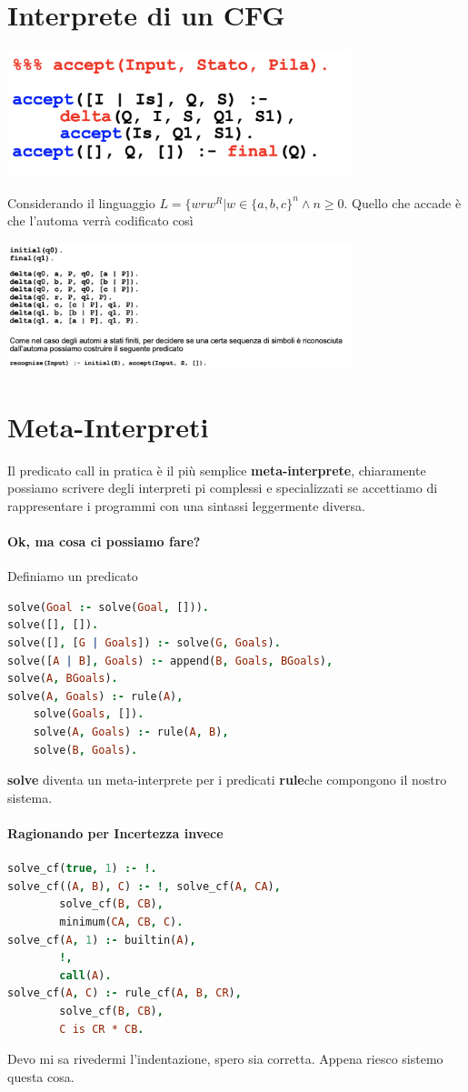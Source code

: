 \documentclass[12pt, a4paper, openany, oneside]{book}
\begin{document}
\section{Interprete di un CFG}
\begin{center}
\includegraphics[width=0.75\textwidth]{acceptpila}
\end{center}
Considerando il linguaggio $L=\{wrw^{R}|w \in\{a,b,c\}^{n} \wedge n\geq0$.
Quello che accade è che l'automa verrà codificato così
\begin{center}
\includegraphics[width=0.75\textwidth]{codificaauto}
\end{center}
\section{Meta-Interpreti}
Il predicato call in pratica è il più semplice \textbf{meta-interprete},
chiaramente possiamo scrivere degli interpreti pi complessi e specializzati
se accettiamo di rappresentare i programmi con una sintassi leggermente 
diversa.
\paragraph{Ok, ma cosa ci possiamo fare? }Definiamo un predicato 
\begin{lstlisting}[language=Prolog]
solve(Goal :- solve(Goal, [])).
solve([], []).
solve([], [G | Goals]) :- solve(G, Goals). 
solve([A | B], Goals) :- append(B, Goals, BGoals),
solve(A, BGoals). 
solve(A, Goals) :- rule(A),
	solve(Goals, []). 
	solve(A, Goals) :- rule(A, B), 
	solve(B, Goals).
\end{lstlisting}
\textbf{solve} diventa un meta-interprete per i predicati \textbf{rule}che
compongono il nostro sistema.
\paragraph{Ragionando per Incertezza invece}
\begin{lstlisting}[language=Prolog]
solve_cf(true, 1) :- !.
solve_cf((A, B), C) :- !, solve_cf(A, CA), 
		solve_cf(B, CB),
		minimum(CA, CB, C).
solve_cf(A, 1) :- builtin(A), 
		!, 
		call(A).
solve_cf(A, C) :- rule_cf(A, B, CR), 
		solve_cf(B, CB), 
		C is CR * CB.
\end{lstlisting}	
Devo mi sa rivedermi l'indentazione, spero sia corretta. 
Appena riesco sistemo questa cosa.
\end{document}
